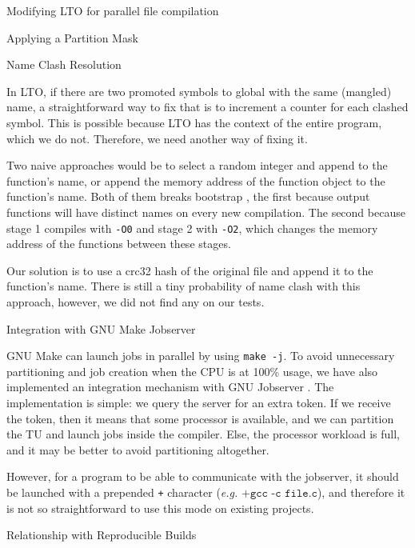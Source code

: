 \begin{section}{Modifying LTO for parallel file compilation}
\begin{subsection}{Applying a Partition Mask}
\end{subsection}

\begin{subsection}{Name Clash Resolution}\label{sec:name_clash_resolution}

In LTO, if there are two promoted symbols to global with the same (mangled) name, a
straightforward way to fix that is to increment a counter for each clashed
symbol. This is possible because LTO has the context of the entire program,
which we do not. Therefore, we need another way of fixing it.

Two naive approaches would be to select a random integer and append to the
function's name, or append the memory address of the function object to the
function's name.  Both of them breaks bootstrap \citep{bootstrap}, the first
because output functions will have distinct names on every new compilation. The
second because stage 1 compiles with \texttt{-O0} and stage 2 with
\texttt{-O2}, which changes the memory address of the functions between these stages.

Our solution is to use a crc32 hash of the original file and append it to the
function's name.  There is still a tiny probability of name clash with this
approach, however, we did not find any on our tests.

\end{subsection}

\begin{subsection}{Integration with GNU Make Jobserver}\label{sec:integration_jobserver}

GNU Make can launch jobs in parallel by using \texttt{make -j}.  To
avoid unnecessary partitioning and job creation when the CPU is at 100\% usage,
we have also implemented an integration mechanism with GNU Jobserver
\citep{posixjobserver}.  The implementation is simple: we query the server for
an extra token. If we receive the token, then it means that some processor is
available, and we can partition the TU and launch jobs inside the compiler.
Else, the processor workload is full, and it may be better to avoid
partitioning altogether.

However, for a program to be able to communicate with the jobserver, it should
be launched with a prepended \texttt{+} character (\textit{e.g.} $\texttt{+gcc
-c file.c}$), and therefore it is not so straightforward to use this mode on
existing projects.

\end{subsection}

\begin{subsection}{Relationship with Reproducible Builds}\label{sec:repro_builds}


\end{subsection}
\end{section}
